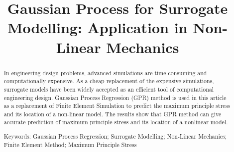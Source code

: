 \documentclass[conference]{IEEEtran}
\begin{document}
%
\title{Gaussian Process for Surrogate Modelling: Application in Non-Linear Mechanics}

% 

\author{

}




\maketitle

\begin{abstract}
In engineering design problems, advanced simulations are time consuming and computationally expensive. As a cheap replacement of the expensive simulations, surrogate models have been widely accepted as an efficient tool of computational engineering design. Gaussian Process Regression (GPR) method is used in this article as a replacement of Finite Element Simulation to predict the maximum principle stress and its location of a non-linear model. The results show that GPR method can give accurate prediction of maximum principle stress and its location of a nonlinear model.

Keywords: Gaussian Process Regression; Surrogate Modelling; Non-Linear Mechanics; Finite Element Method; Maximum Principle Stress
\end{abstract}
\IEEEpeerreviewmaketitle
\end{document}
